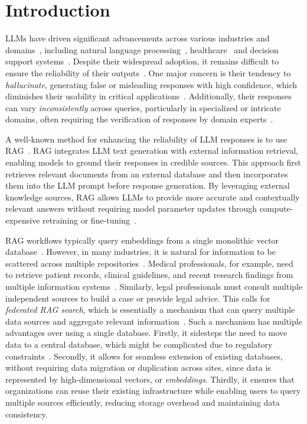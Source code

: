 \section{Introduction}
\label{sec:intro}
\acresetall

\Acfp{LLM} have driven significant advancements across various industries and domains~\cite{bharathi2024analysis}, including natural language processing~\cite{kaplan2020scaling}, healthcare~\cite{haltaufderheide2024ethics} and decision support systems~\cite{eigner2024determinants}.
Despite their widespread adoption, it remains difficult to ensure the reliability of their outputs~\cite{shi2025know}.
One major concern is their tendency to \emph{hallucinate}, generating false or misleading responses with high confidence, which diminishes their usability in critical applications~\cite{ji2023towards}.
Additionally, their responses can vary \emph{inconsistently} across queries, particularly in specialized or intricate domains, often requiring the verification of responses by domain experts~\cite{lee2024one}.

A well-known method for enhancing the reliability of \ac{LLM} responses is to use \ac{RAG}~\cite{lewis2020retrieval}.
\ac{RAG} integrates \ac{LLM} text generation with external information retrieval, enabling models to ground their responses in credible sources.
This approach first retrieves relevant documents from an external database and then incorporates them into the \ac{LLM} prompt before response generation.
By leveraging external knowledge sources, \ac{RAG} allows \acp{LLM} to provide more accurate and contextually relevant answers without requiring model parameter updates through compute-expensive retraining or fine-tuning~\cite{csakar2025maximizing}.



\ac{RAG} workflows typically query embeddings from a single monolithic vector database~\cite{kukreja2024performance}.
However, in many industries, it is natural for information to be scattered across multiple repositories~\cite{bhavnani2009information}.
Medical professionals, for example, need to retrieve patient records, clinical guidelines, and recent research findings from multiple information systems~\cite{jiang2024clinical}.
Similarly, legal professionals must consult multiple independent sources to build a case or provide legal advice.
This calls for \emph{federated RAG search}, which is essentially a mechanism that can query multiple data sources and aggregate relevant information~\cite{shokouhi2011federated}.
Such a mechanism has multiple advantages over using a single database.
Firstly, it sidesteps the need to move data to a central database, which might be complicated due to regulatory constraints~\cite{kairouz2021advances}.
Secondly, it allows for seamless extension of existing databases, without requiring data migration or duplication across sites, since data is represented by high-dimensional vectors, or \emph{embeddings}.
Thirdly, it ensures that organizations can reuse their existing infrastructure while enabling users to query multiple sources efficiently, reducing storage overhead and maintaining data consistency.



